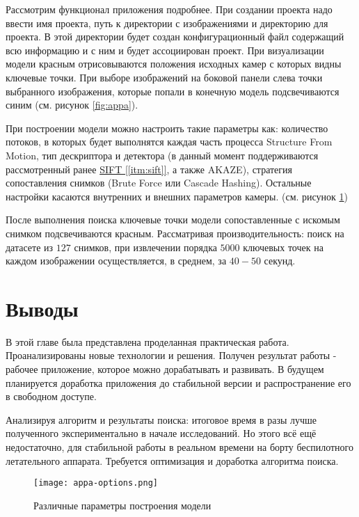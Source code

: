 Рассмотрим функционал приложения подробнее. При создании проекта надо ввести имя проекта, путь к директории с изображениями и директорию для проекта. В этой директории будет создан конфигурационный файл содержащий всю информацию и с ним и будет ассоциирован проект. При визуализации модели красным отрисовываются положения исходных камер с которых видны ключевые точки. При выборе изображений на боковой панели слева точки выбранного изображения, которые попали в конечную модель подсвечиваются синим (см. рисунок \ref{fig:appa}).

При построении модели можно настроить такие параметры как: количество потоков, в которых будет выполнятся каждая часть процесса Structure From Motion, тип дескриптора и детектора (в данный момент поддерживаются рассмотренный ранее \hyperref[itm:sift]{SIFT [\ref{itm:sift}]}, а также AKAZE), стратегия сопоставления снимков (Brute Force или Cascade Hashing). Остальные настройки касаются внутренних и внешних параметров камеры. (см. рисунок \ref{fig:appa-options})

После выполнения поиска ключевые точки модели сопоставленные с искомым снимком подсвечиваются красным. Рассматривая производительность: поиск на датасете из $127$ снимков, при извлечении порядка $5000$ ключевых точек на каждом изображении осуществляется, в среднем, за $40-50$ секунд.

\section{Выводы}

В этой главе была представлена проделанная практическая работа. Проанализированы новые технологии и решения. Получен результат работы - рабочее приложение, которое можно дорабатывать и развивать. В будущем планируется доработка приложения до стабильной версии и распространение его в свободном доступе.

Анализируя алгоритм и результаты поиска: итоговое время в разы лучше полученного экспериментально в начале исследований. Но этого всё ещё недостаточно, для стабильной работы в реальном времени на борту беспилотного летательного аппарата. Требуется оптимизация и доработка алгоритма поиска.

\begin{figure}[h]
    \centering
    \texttt{[image: appa-options.png]}
    \caption{Различные параметры построения модели}
    \label{fig:appa-options}
\end{figure}